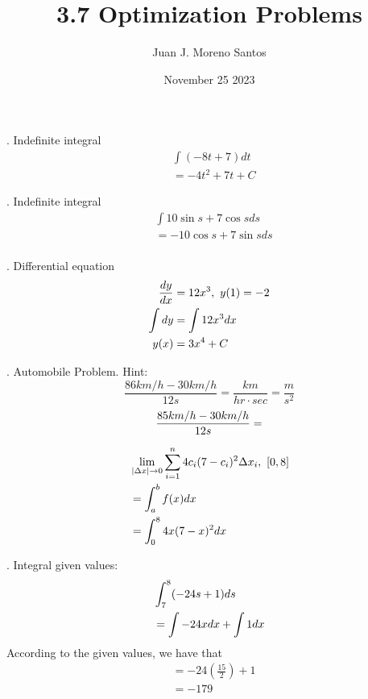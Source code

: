 \documentclass[11pt]{article}
\newcommand*{\vs}{\vspace{1cm}}
\newcommand*{\next}{\noindent}
\newcommand*{\set}{\setcounter{equation}{0}}
\begin{document}
\title{3.7 Optimization Problems}
\author{Juan J. Moreno Santos}
\date{November 25 2023}

\maketitle
\next
1. Indefinite integral
\begin{align}
    &\int (-8t+7)dt\\
    &=-4t^2+7t+C
\end{align}

\vs\next
2. Indefinite integral
\begin{align}
    &\int 10\sin s+7\cos s ds\\
    &=-10\cos s+7\sin s ds\\
\end{align}

\vs\next
3. Differential equation
\begin{align}
    \set
    \frac{dy}{dx}&=12x^3,\,\, y(1)=-2\\
    \int dy&=\int 12x^3dx\\
    y(x)&=3x^4+C
\end{align}

\vs\next
4. Automobile Problem. Hint:
\[\frac{86km/h-30km/h}{12s}= \frac{km}{hr\cdot sec}=\frac{m}{s^2}\]
\begin{align}
    \set
    \frac{85km/h-30km/h}{12s}=
\end{align}

\vs\next
\begin{align}
    \set
    &\lim_{|\Delta x|\to 0}\sum_{i=1}^{n}4c_i(7-c_i)^2\Delta x_i,\,\,[0, 8]\\
    &=\int_{a}^{b}f(x)dx\\
    &=\int_{0}^{8}4x(7-x)^2dx
\end{align}

\vs\next
12. Integral given values:
\begin{align}
    \set
    &\int_{7}^{8}(-24s+1)ds\\
    &=\int -24xdx+\int 1dx\\
\end{align}
According to the given values, we have that
\begin{align}
    &=-24\left(\frac{15}{2}\right)+1\\
    &=-179
\end{align}
\end{document}
